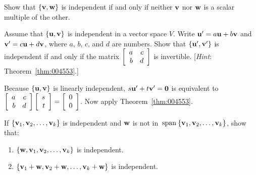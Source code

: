 \begin{multicols}{2}
\begin{ex}
Show that $\{\textbf{v}, \textbf{w}\}$ is independent if and only if neither $\textbf{v}$ nor $\textbf{w}$ is a scalar multiple of the other.
\end{ex}

\begin{ex}
Assume that $\{\textbf{u}, \textbf{v}\}$ is independent in a vector space $V$. Write $\textbf{u}^\prime = a\textbf{u} + b\textbf{v}$ and $\textbf{v}^\prime = c\textbf{u} + d\textbf{v}$, where $a$, $b$, $c$, and $d$ are numbers. Show that $\{\textbf{u}^\prime, \textbf{v}^\prime\}$ is independent if and only if the matrix 
$\left[ \begin{array}{rr}
a & c \\
b & d
\end{array} \right]$
 is invertible. [\textit{Hint}: Theorem~\ref{thm:004553}.]

\begin{sol}
Because $\{\textbf{u}, \textbf{v}\}$ is linearly independent, $s\textbf{u}^\prime + t\textbf{v}^\prime = \textbf{0}$ is equivalent to 
$\left[ \begin{array}{rr}
a & c \\
b & d
\end{array} \right]
\left[ \begin{array}{r}
s \\
t
\end{array} \right]
= 
\left[ \begin{array}{r}
0 \\
0
\end{array} \right]$. Now apply Theorem~\ref{thm:004553}.
\end{sol}
\end{ex}

\begin{ex}
If $\{\textbf{v}_{1}, \textbf{v}_{2}, \dots, \textbf{v}_{k}\}$ is independent and $\textbf{w}$ is not in $\thinspace\operatorname{span\medspace}\{\textbf{v}_{1}, \textbf{v}_{2}, \dots, \textbf{v}_{k}\}$, show that:

\begin{enumerate}[label={\alph*.}]
\item $\{\textbf{w}, \textbf{v}_{1}, \textbf{v}_{2}, \dots, \textbf{v}_{k}\}$ is independent.

\item $\{\textbf{v}_{1} + \textbf{w}, \textbf{v}_{2} + \textbf{w}, \dots, \textbf{v}_{k} + \textbf{w}\}$ is independent.

\end{enumerate}
\end{ex}


\end{multicols}

